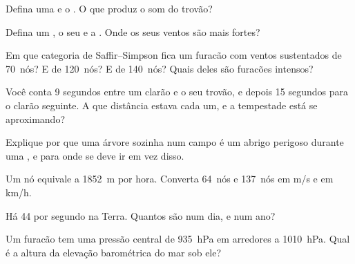 \begin{exercise}[$\star$]\label{exo:g10:storms-and-cyclones:1}
Defina uma  e o . O que produz o som do trovão?
\end{exercise}

\begin{exercise}[$\star$]\label{exo:g10:storms-and-cyclones:2}
Defina um , o seu  e a . Onde os seus
ventos são mais fortes?
\end{exercise}

\begin{exercise}[$\star$]\label{exo:g10:storms-and-cyclones:3}
Em que categoria de Saffir--Simpson fica um furacão com ventos sustentados
de \num{70}~nós? E de \num{120}~nós? E de \num{140}~nós? Quais deles são
furacões intensos?
\end{exercise}

\begin{exercise}[$\star$]\label{exo:g10:storms-and-cyclones:4}
Você conta \num{9} segundos entre um clarão e o seu trovão, e depois
\num{15} segundos para o clarão seguinte. A que distância estava cada um, e
a tempestade está se aproximando?
\end{exercise}

\begin{exercise}[$\star$]\label{exo:g10:storms-and-cyclones:5}
Explique por que uma árvore sozinha num campo é um abrigo perigoso durante
uma , e para onde se deve ir em vez disso.
\end{exercise}

\begin{exercise}[$\star\star$]\label{exo:g10:storms-and-cyclones:6}
Um nó equivale a \qty{1852}{m} por hora. Converta \num{64}~nós e
\num{137}~nós em \unit{m/s} e em \unit{km/h}.
\end{exercise}

\begin{exercise}[$\star\star$]\label{exo:g10:storms-and-cyclones:7}
Há 44  por segundo na Terra. Quantos são num dia, e num ano?
\end{exercise}

\begin{exercise}[$\star\star$]\label{exo:g10:storms-and-cyclones:8}
Um furacão tem uma pressão central de \qty{935}{hPa} em arredores a
\qty{1010}{hPa}. Qual é a altura da elevação barométrica do mar sob ele?
\end{exercise}

